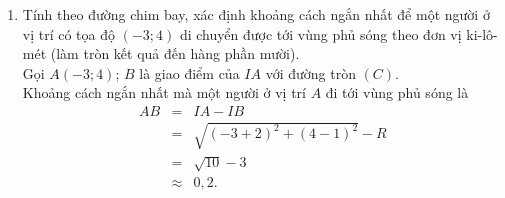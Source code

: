 \begin{bt}
{\begin{enumerate}
			Vậy người dùng điện thoại sử dụng được dịch vụ của trạm.
			\item Tính theo đường chim bay, xác định khoảng cách ngắn nhất để một người ở vị trí có tọa độ $ (-3;4) $ di chuyển được tới vùng phủ sóng theo đơn vị ki-lô-mét (làm tròn kết quả đến hàng phần mười).\\
			Gọi $ A(-3;4) $; $ B $ là giao điểm của $ IA $ với đường tròn $ (C) $.\\
			Khoảng cách ngắn nhất mà một người ở vị trí $ A $ đi tới vùng phủ sóng là 
			\allowdisplaybreaks
			\begin{eqnarray*}
				AB&=&IA-IB \\
				&=&\sqrt{(-3+2)^2+(4-1)^2}-R\\
				&=&\sqrt{10}-3\\
				&\approx&0{,}2.
			\end{eqnarray*}
		\end{enumerate}	
	}
\end{bt}
